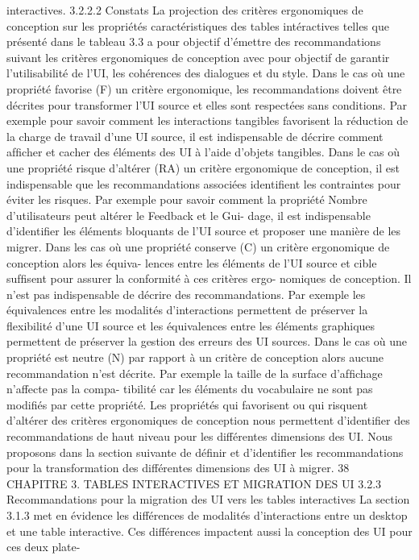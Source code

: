 \documentclass{article}
\begin{document}
interactives.
3.2.2.2
Constats
La projection des critères ergonomiques de conception sur les propriétés caractéristiques des tables
intéractives telles que présenté dans le tableau 3.3 a pour objectif d’émettre des recommandations
suivant les critères ergonomiques de conception avec pour objectif de garantir l’utilisabilité de l’UI,
les cohérences des dialogues et du style.
Dans le cas où une propriété favorise (F) un critère ergonomique, les recommandations doivent
être décrites pour transformer l’UI source et elles sont respectées sans conditions. Par exemple pour
savoir comment les interactions tangibles favorisent la réduction de la charge de travail d’une UI
source, il est indispensable de décrire comment afﬁcher et cacher des éléments des UI à l’aide d’objets
tangibles.
Dans le cas où une propriété risque d’altérer (RA) un critère ergonomique de conception, il est
indispensable que les recommandations associées identiﬁent les contraintes pour éviter les risques. Par
exemple pour savoir comment la propriété Nombre d’utilisateurs peut altérer le Feedback et le Gui-
dage, il est indispensable d’identiﬁer les éléments bloquants de l’UI source et proposer une manière
de les migrer.
Dans les cas où une propriété conserve (C) un critère ergonomique de conception alors les équiva-
lences entre les éléments de l’UI source et cible sufﬁsent pour assurer la conformité à ces critères ergo-
nomiques de conception. Il n’est pas indispensable de décrire des recommandations. Par exemple les
équivalences entre les modalités d’interactions permettent de préserver la ﬂexibilité d’une UI source
et les équivalences entre les éléments graphiques permettent de préserver la gestion des erreurs des UI
sources.
Dans le cas où une propriété est neutre (N) par rapport à un critère de conception alors aucune
recommandation n’est décrite. Par exemple la taille de la surface d’afﬁchage n’affecte pas la compa-
tibilité car les éléments du vocabulaire ne sont pas modiﬁés par cette propriété.
Les propriétés qui favorisent ou qui risquent d’altérer des critères ergonomiques de conception
nous permettent d’identiﬁer des recommandations de haut niveau pour les différentes dimensions des
UI. Nous proposons dans la section suivante de déﬁnir et d’identiﬁer les recommandations pour la
transformation des différentes dimensions des UI à migrer.
38
CHAPITRE 3. TABLES INTERACTIVES ET MIGRATION DES UI
3.2.3
Recommandations pour la migration des UI vers les tables interactives
La section 3.1.3 met en évidence les différences de modalités d’interactions entre un desktop
et une table interactive. Ces différences impactent aussi la conception des UI pour ces deux plate-
\end{document}
